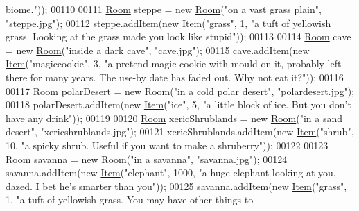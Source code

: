 \begin{DoxyCode}
{       biome."}));
00110 
00111         \hyperlink{classpkg__world_1_1Room}{Room} steppe = \textcolor{keyword}{new} \hyperlink{classpkg__world_1_1Room}{Room}(\textcolor{stringliteral}{"on a vast grass plain"}, \textcolor{stringliteral}{"steppe.jpg"});
00112         steppe.addItem(\textcolor{keyword}{new} \hyperlink{classpkg__world_1_1Item}{Item}(\textcolor{stringliteral}{"grass"}, 1, \textcolor{stringliteral}{"a tuft of yellowish grass. Looking at the grass made you
       look like stupid"}));
00113 
00114         \hyperlink{classpkg__world_1_1Room}{Room} cave = \textcolor{keyword}{new} \hyperlink{classpkg__world_1_1Room}{Room}(\textcolor{stringliteral}{"inside a dark cave"}, \textcolor{stringliteral}{"cave.jpg"});
00115         cave.addItem(\textcolor{keyword}{new} \hyperlink{classpkg__world_1_1Item}{Item}(\textcolor{stringliteral}{"magiccookie"}, 3, \textcolor{stringliteral}{"a pretend magic cookie with mould on it, probably left
       there for many years. The use-by date has faded out. Why not eat it?"}));
00116 
00117         \hyperlink{classpkg__world_1_1Room}{Room} polarDesert = \textcolor{keyword}{new} \hyperlink{classpkg__world_1_1Room}{Room}(\textcolor{stringliteral}{"in a cold polar desert"}, \textcolor{stringliteral}{"polardesert.jpg"});
00118         polarDesert.addItem(\textcolor{keyword}{new} \hyperlink{classpkg__world_1_1Item}{Item}(\textcolor{stringliteral}{"ice"}, 5, \textcolor{stringliteral}{"a little block of ice. But you don't have any drink"}));
00119 
00120         \hyperlink{classpkg__world_1_1Room}{Room} xericShrublands = \textcolor{keyword}{new} \hyperlink{classpkg__world_1_1Room}{Room}(\textcolor{stringliteral}{"in a sand desert"}, \textcolor{stringliteral}{"xericshrublands.jpg"});
00121         xericShrublands.addItem(\textcolor{keyword}{new} \hyperlink{classpkg__world_1_1Item}{Item}(\textcolor{stringliteral}{"shrub"}, 10, \textcolor{stringliteral}{"a spicky shrub. Useful if you want to make a
       shruberry"}));
00122 
00123         \hyperlink{classpkg__world_1_1Room}{Room} savanna = \textcolor{keyword}{new} \hyperlink{classpkg__world_1_1Room}{Room}(\textcolor{stringliteral}{"in a savanna"}, \textcolor{stringliteral}{"savanna.jpg"});
00124         savanna.addItem(\textcolor{keyword}{new} \hyperlink{classpkg__world_1_1Item}{Item}(\textcolor{stringliteral}{"elephant"}, 1000, \textcolor{stringliteral}{"a huge elephant looking at you, dazed. I bet he's
       smarter than you"}));
00125         savanna.addItem(\textcolor{keyword}{new} \hyperlink{classpkg__world_1_1Item}{Item}(\textcolor{stringliteral}{"grass"}, 1, \textcolor{stringliteral}{"a tuft of yellowish grass. You may have other things to
}
\end{DoxyCode}
